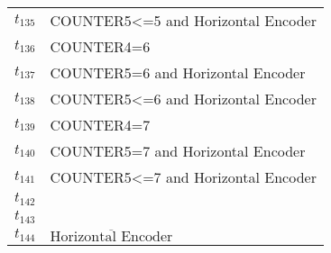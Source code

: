 \begin{longtable}{M{5cm}M{10cm}}
\hyperlink{partialNet:t135}{\hypertarget{partialTable:t135}{$t_{135}$}} & COUNTER5<=5 and Horizontal Encoder\\
\hyperlink{partialNet:t136}{\hypertarget{partialTable:t136}{$t_{136}$}} & COUNTER4=6\\
\hyperlink{partialNet:t137}{\hypertarget{partialTable:t137}{$t_{137}$}} & COUNTER5=6 and Horizontal Encoder\\
\hyperlink{partialNet:t138}{\hypertarget{partialTable:t138}{$t_{138}$}} & COUNTER5<=6 and Horizontal Encoder\\
\hyperlink{partialNet:t139}{\hypertarget{partialTable:t139}{$t_{139}$}} & COUNTER4=7\\
\hyperlink{partialNet:t140}{\hypertarget{partialTable:t140}{$t_{140}$}} & COUNTER5=7 and Horizontal Encoder\\
\hyperlink{partialNet:t141}{\hypertarget{partialTable:t141}{$t_{141}$}} & COUNTER5<=7 and Horizontal Encoder\\
\hyperlink{partialNet:t142}{\hypertarget{partialTable:t142}{$t_{142}$}} & \\
\hyperlink{partialNet:t143}{\hypertarget{partialTable:t143}{$t_{143}$}} & \\
\hyperlink{partialNet:t144}{\hypertarget{partialTable:t144}{$t_{144}$}} & \(\overline{\mbox{Horizontal Encoder}}\)\\
\end{longtable}

